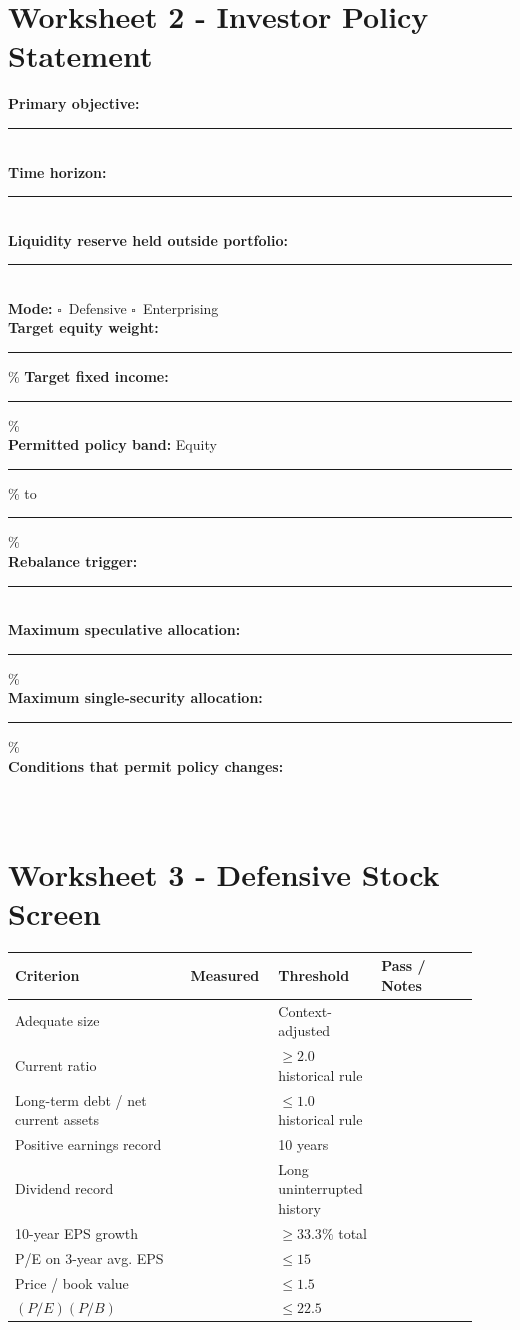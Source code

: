 \documentclass[11pt]{article}
\newcommand{\checkbox}{\(\square\)}
\newcommand{\blankline}{\makebox[\linewidth][l]{\rule{0.96\linewidth}{0.35pt}}}
\begin{document}
\section{Worksheet 2 - Investor Policy Statement}
\begin{worksheetbox}[Policy]\raggedright
\textbf{Primary objective:} \rule{0.66\linewidth}{0.35pt}\\[8pt]
\textbf{Time horizon:} \rule{0.72\linewidth}{0.35pt}\\[8pt]
\textbf{Liquidity reserve held outside portfolio:} \rule{0.47\linewidth}{0.35pt}\\[8pt]
\textbf{Mode:} \checkbox\ Defensive \quad \checkbox\ Enterprising\\[8pt]
\textbf{Target equity weight:} \rule{1.0in}{0.35pt}\% \qquad
\textbf{Target fixed income:} \rule{1.0in}{0.35pt}\%\\[8pt]
\textbf{Permitted policy band:} Equity \rule{0.8in}{0.35pt}\% to \rule{0.8in}{0.35pt}\%\\[8pt]
\textbf{Rebalance trigger:} \rule{0.67\linewidth}{0.35pt}\\[8pt]
\textbf{Maximum speculative allocation:} \rule{1.0in}{0.35pt}\%\\[8pt]
\textbf{Maximum single-security allocation:} \rule{1.0in}{0.35pt}\%\\[8pt]
\textbf{Conditions that permit policy changes:}\\[4pt]
\blankline\\[10pt]\blankline\\[10pt]
\end{worksheetbox}

\section{Worksheet 3 - Defensive Stock Screen}
\begin{longtable}{@{}p{0.36\linewidth}p{0.18\linewidth}p{0.18\linewidth}p{0.20\linewidth}@{}}
\toprule
\textbf{Criterion} & \textbf{Measured} & \textbf{Threshold} & \textbf{Pass / Notes}\\
\midrule
Adequate size & & Context-adjusted & \\
Current ratio & & $\ge2.0$ historical rule & \\
Long-term debt / net current assets & & $\le1.0$ historical rule & \\
Positive earnings record & & 10 years & \\
Dividend record & & Long uninterrupted history & \\
10-year EPS growth & & $\ge 33.3\%$ total & \\
P/E on 3-year avg. EPS & & $\le15$ & \\
Price / book value & & $\le1.5$ & \\
$(P/E)(P/B)$ & & $\le22.5$ & \\
\bottomrule
\end{longtable}
\end{document}

